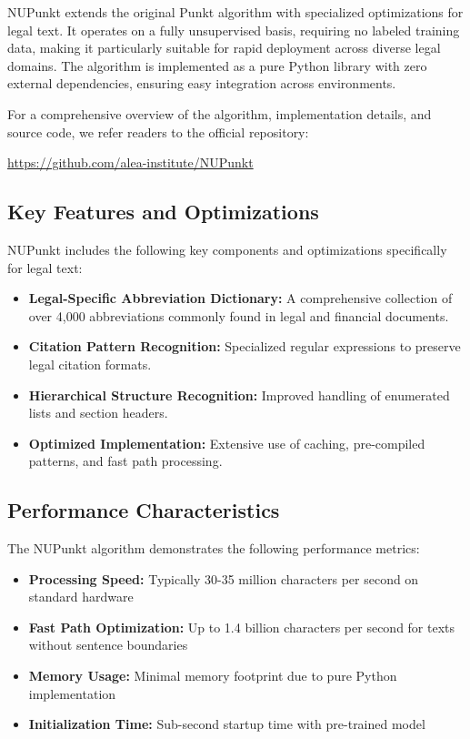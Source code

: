NUPunkt extends the original Punkt algorithm \cite{kiss2006unsupervised} with specialized optimizations for legal text. It operates on a fully unsupervised basis, requiring no labeled training data, making it particularly suitable for rapid deployment across diverse legal domains. The algorithm is implemented as a pure Python library with zero external dependencies, ensuring easy integration across environments.

For a comprehensive overview of the algorithm, implementation details, and source code, we refer readers to the official repository:

\begin{center}
\url{https://github.com/alea-institute/NUPunkt}
\end{center}

\subsection{Key Features and Optimizations}

NUPunkt includes the following key components and optimizations specifically for legal text:

\begin{itemize}
\item \textbf{Legal-Specific Abbreviation Dictionary:} A comprehensive collection of over 4,000 abbreviations commonly found in legal and financial documents.
\item \textbf{Citation Pattern Recognition:} Specialized regular expressions to preserve legal citation formats.
\item \textbf{Hierarchical Structure Recognition:} Improved handling of enumerated lists and section headers.
\item \textbf{Optimized Implementation:} Extensive use of caching, pre-compiled patterns, and fast path processing.
\end{itemize}

\subsection{Performance Characteristics}

The NUPunkt algorithm demonstrates the following performance metrics:
\begin{itemize}
\item \textbf{Processing Speed:} Typically 30-35 million characters per second on standard hardware
\item \textbf{Fast Path Optimization:} Up to 1.4 billion characters per second for texts without sentence boundaries
\item \textbf{Memory Usage:} Minimal memory footprint due to pure Python implementation
\item \textbf{Initialization Time:} Sub-second startup time with pre-trained model
\end{itemize}

